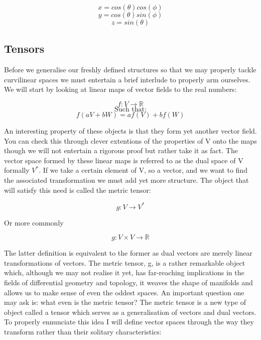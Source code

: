 \documentclass{article}
\begin{document}
  \begin{equation*}
    x = cos(\theta) cos(\phi)
  \end{equation*}
  \begin{equation*}
    y = cos(\theta)sin(\phi)
  \end{equation*}
  \begin{equation*}
    z = sin(\theta)
  \end{equation*}

  \newpage

  \subsection{Tensors}

  Before we generalise our freshly defined structures so that we may properly tackle curvilinear spaces we must entertain a brief interlude to properly arm ourselves. We will start by looking at linear maps of vector fields to the real numbers:

  \begin{equation*}
    f: V \rightarrow \mathbb R
  \end{equation*}
  \begin{equation*}
    \text{Such that:}
  \end{equation*}
  \begin{equation*}
    f(aV + bW) = af(V) + bf(W)
  \end{equation*}

  An interesting property of these objects is that they form yet another vector field. You can check this through clever extentions of the properties of V onto the maps though we will not entertain a rigorous proof but rather take it as fact. The vector space formed by these linear maps is referred to as the dual space of V formally $V^*$. If we take a certain element of V, so a vector, and we want to find the associated transformation we must add yet more structure. The object that will satisfy this need is called the metric tensor:

  \begin{equation*}
    g: V \rightarrow V^*
  \end{equation*}

  Or more commonly

  \begin{equation*}
    g: V \times V \rightarrow \mathbb R
  \end{equation*}

  The latter definition is equivalent to the former as dual vectors are merely linear transformations of vectors. The metric tensor, g, is a rather remarkable object which, although we may not realise it yet, has far-reaching implications in the fields of differential geometry and topology, it weaves the shape of manifolds and allows us to make sense of even the oddest spaces. An important question one may ask is: what even is the metric tensor? The metric tensor is a new type of object called a tensor which serves as a generalisation of vectors and dual vectors. To properly ennunciate this idea I will define vector spaces through the way they transform rather than their solitary characteristics:
\end{document}
